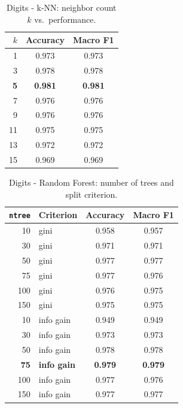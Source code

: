 \documentclass[11pt]{article}
\begin{document}
\begin{table}[H]
  \centering
  \footnotesize
  \caption{Digits - k-NN: neighbor count $k$ vs.\ performance.}
  \label{tab:digits-knn}
  \begin{tabular}{rcc}
    \toprule
    $k$ & Accuracy & Macro F1 \\
    \midrule
    1 & 0.973 & 0.973 \\
    3 & 0.978 & 0.978 \\
    \textbf{5} & \textbf{0.981} & \textbf{0.981} \\
    7 & 0.976 & 0.976 \\
    9 & 0.976 & 0.976 \\
    11 & 0.975 & 0.975 \\
    13 & 0.972 & 0.972 \\
    15 & 0.969 & 0.969 \\
    \bottomrule
  \end{tabular}
\end{table}

\begin{table}[H]
  \centering
  \footnotesize
  \caption{Digits - Random Forest: number of trees and split criterion.}
  \label{tab:digits-rf}
  \begin{tabular}{r l cc}
    \toprule
    \texttt{ntree} & Criterion & Accuracy & Macro F1 \\
    \midrule
    10 & gini & 0.958 & 0.957 \\
    30 & gini & 0.971 & 0.971 \\
    50 & gini & 0.977 & 0.977 \\
    75 & gini & 0.977 & 0.976 \\
    100 & gini & 0.976 & 0.975 \\
    150 & gini & 0.975 & 0.975 \\
    \midrule
    10 & info gain & 0.949 & 0.949 \\
    30 & info gain & 0.973 & 0.973 \\
    50 & info gain & 0.978 & 0.978 \\
    \textbf{75} & \textbf{info gain} & \textbf{0.979} & \textbf{0.979} \\
    100 & info gain & 0.977 & 0.976 \\
    150 & info gain & 0.977 & 0.977 \\
    \bottomrule
  \end{tabular}
\end{table}
\end{document}
